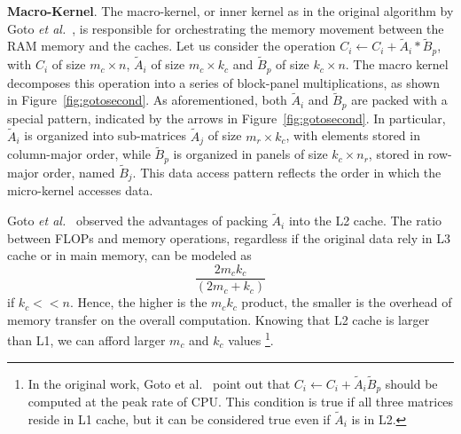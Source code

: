 

\noindent \textbf{Macro-Kernel}. The macro-kernel, or inner kernel as in the original algorithm by Goto \textit{et al.}~\cite{goto2008anatomy}, is responsible for orchestrating the memory movement between the RAM memory and the caches. Let us consider the operation $C_i \leftarrow C_i +  \tilde{A}_i*  \tilde{B}_p $, with $C_i$ of size $m_c \times n$, $\tilde{A}_i$ of size $m_c \times k_c$ and $\tilde{B}_p$ of size $k_c \times n$. The macro kernel decomposes this operation into a series of block-panel multiplications, as shown in Figure~\ref{fig:gotosecond}. As aforementioned, both $\tilde{A}_i$ and $ \tilde{B}_p$ are packed with a special pattern, indicated by the arrows in Figure~\ref{fig:gotosecond}. In particular, $\tilde{A}_i$ is organized into sub-matrices $\tilde{A}_j$ of size $m_r \times k_c$, with elements stored in column-major order, while $ \tilde{B}_p$ is organized in panels of size $k_c \times n_r$, stored in row-major order, named $\tilde{B}_j$. This data access pattern reflects the order in which the micro-kernel accesses data. 

Goto \textit{et al.}~\cite{goto2008anatomy} observed the advantages of packing $\tilde{A}_i$ into the L2 cache. The ratio between FLOPs and memory operations, regardless if the original data rely in L3 cache or in main memory, can be modeled as
 $$ \frac{2 m_{c} k_{c}}{\left(2 m_{c}+k_{c}\right)} $$
if $k_c << n$.
Hence, the higher is the $m_c k_c$ product, the smaller is the overhead of memory transfer on the overall computation. 
Knowing that L2 cache is larger than L1, we can afford larger $m_c$ and $k_c$ values \footnote{In the original work, Goto et al.~\cite{goto2008anatomy} point out that $C_i \leftarrow C_i +  \tilde{A}_i  \tilde{B}_p $ should be computed at the peak rate of CPU. This condition is true if all three matrices reside in L1 cache, but it can be considered true even if $\tilde{A}_i$ is in L2.}.


